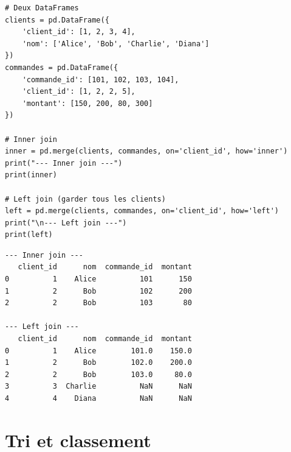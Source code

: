 \begin{codeblock}[title=\textbf{Python --- merge}]
\begin{verbatim}
# Deux DataFrames
clients = pd.DataFrame({
    'client_id': [1, 2, 3, 4],
    'nom': ['Alice', 'Bob', 'Charlie', 'Diana']
})
commandes = pd.DataFrame({
    'commande_id': [101, 102, 103, 104],
    'client_id': [1, 2, 2, 5],
    'montant': [150, 200, 80, 300]
})

# Inner join
inner = pd.merge(clients, commandes, on='client_id', how='inner')
print("--- Inner join ---")
print(inner)

# Left join (garder tous les clients)
left = pd.merge(clients, commandes, on='client_id', how='left')
print("\n--- Left join ---")
print(left)
\end{verbatim}
\end{codeblock}

\begin{codeoutput}
\begin{verbatim}
--- Inner join ---
   client_id      nom  commande_id  montant
0          1    Alice          101      150
1          2      Bob          102      200
2          2      Bob          103       80

--- Left join ---
   client_id      nom  commande_id  montant
0          1    Alice        101.0    150.0
1          2      Bob        102.0    200.0
2          2      Bob        103.0     80.0
3          3  Charlie          NaN      NaN
4          4    Diana          NaN      NaN
\end{verbatim}
\end{codeoutput}

\begin{center}
\end{center}

\section{Tri et classement}

